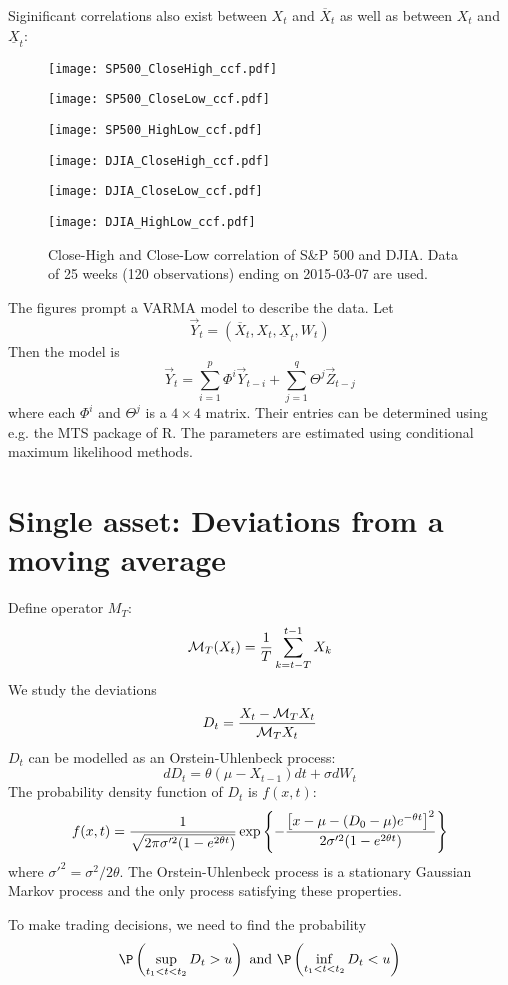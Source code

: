 \documentclass{article}
\begin{document}
Siginificant correlations also exist between $X_t$ and $\overline X_t$
as well as between $X_t$ and $\underline X_t$:
\begin{figure}[!htb]
\begin{minipage}{0.33\linewidth}
  \texttt{[image: SP500\_CloseHigh\_ccf.pdf]}
\end{minipage}\hfill
\begin{minipage}{0.33\linewidth}
  \texttt{[image: SP500\_CloseLow\_ccf.pdf]}
\end{minipage}\hfill
\begin{minipage}{0.33\linewidth}
  \texttt{[image: SP500\_HighLow\_ccf.pdf]}
\end{minipage}
\begin{minipage}{0.33\linewidth}
  \texttt{[image: DJIA\_CloseHigh\_ccf.pdf]}
\end{minipage}\hfill
\begin{minipage}{0.33\linewidth}
  \texttt{[image: DJIA\_CloseLow\_ccf.pdf]}
\end{minipage}\hfill
\begin{minipage}{0.33\linewidth}
  \texttt{[image: DJIA\_HighLow\_ccf.pdf]}
\end{minipage}
\caption{Close-High and Close-Low correlation of S\&P 500 and
  DJIA. Data of 25 weeks (120 observations) ending on 2015-03-07 are
  used.}
\end{figure}

The figures prompt a VARMA model to describe the data. Let
\[
\vec Y_t = (\overline X_t, X_t, \underline X_t, W_t)
\]
Then the model is
\[
\vec Y_t = \sum_{i=1}^p \Phi^i \vec Y_{t-i} + \sum_{j=1}^q \Theta^j \vec Z_{t-j}
\]
where each $\Phi^i$ and $\Theta^j$ is a $4 \times 4$ matrix. Their
entries can be determined using e.g. the MTS package of R. The
parameters are estimated using conditional maximum likelihood methods.

\section{Single asset: Deviations from a moving average}
Define operator $M_T$:
\[
\mathcal M_T(X_t) = {1 \over T}\sum_{k = t - T}^{t - 1} X_k
\]
We study the deviations
\[
D_t = {X_t - \mathcal M_T X_t \over \mathcal M_T X_t}
\]
$D_t$ can be modelled as an Orstein-Uhlenbeck process:
\[
d D_t = \theta (\mu - X_{t-1})dt + \sigma d W_t
\]
The probability density function of $D_t$ is $f(x, t)$:
\[
f(x, t) = {1
  \over
  \sqrt{2 \pi \sigma'^2 (1 - e^{2 \theta t})}
}
\exp \left\{
- {
  \left[ x - \mu - (D_0 - \mu)e^{-\theta t} \right]^2
  \over
  2 \sigma'^2 (1 - e^{2 \theta t})
}
\right\}
\]
where $\sigma'^2 = \sigma^2/2\theta$. The Orstein-Uhlenbeck process is
a stationary Gaussian Markov process and the only process satisfying
these properties.

To make trading decisions, we need to find the probability
\[
\P \left( \sup_{t_1 < t < t_2} D_t > u\right) \text{ and }
\P \left( \inf_{t_1 < t < t_2} D_t < u\right)
\]
\end{document}
